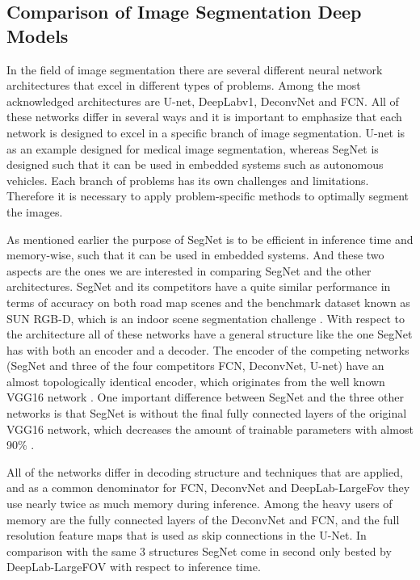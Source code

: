\documentclass{article}
\begin{document}
\subsection{Comparison of Image Segmentation Deep Models}
In the field of image segmentation there are several different neural network architectures that excel in different types of problems. Among the most acknowledged architectures are U-net, DeepLabv1, DeconvNet and FCN. 
All of these networks differ in several ways and it is important to emphasize that each network is designed to excel in a specific branch of image segmentation. U-net is as an example designed for medical image segmentation, whereas SegNet is designed such that it can be used in embedded systems such as autonomous vehicles. Each branch of problems has its own challenges and limitations. Therefore it is necessary to apply problem-specific methods to optimally segment the images. 


As mentioned earlier the purpose of SegNet is to be efficient in inference time and memory-wise, such that it can be used in embedded systems. And these two aspects are the ones we are interested in comparing SegNet and the other architectures. 
SegNet and its competitors have a quite similar performance in terms of accuracy on both road map scenes and the benchmark dataset known as SUN RGB-D, which is an indoor scene segmentation challenge \cite{seg}. 
With respect to the architecture all of these networks have a general structure like the one SegNet has with both an encoder and a decoder. The encoder of the competing networks (SegNet and three of the four competitors FCN, DeconvNet, U-net) have an almost topologically identical encoder, which originates from the well known VGG16 network \cite{VGG16}. One important difference between SegNet and the three other networks is that SegNet is without the final fully connected layers of the original VGG16 network, which decreases the amount of trainable parameters with almost 90\% \cite{seg}. 


All of the networks differ in decoding structure and techniques that are applied, and as a common denominator for FCN, DeconvNet and DeepLab-LargeFov they use nearly twice as much memory during inference. Among the heavy users of memory are the fully connected layers of the DeconvNet and FCN, and the full resolution feature maps that is used as skip connections in the U-Net. In comparison with the same 3 structures SegNet come in second only bested by DeepLab-LargeFOV with respect to inference time.
\end{document}
